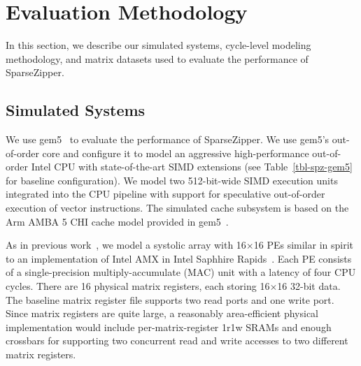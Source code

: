 
\section{Evaluation Methodology}
\label{sec-spz-methodology}

In this section, we describe our simulated systems, cycle-level modeling
methodology, and matrix datasets used to evaluate the performance of
SparseZipper.

\subsection{Simulated Systems}



We use gem5~\cite{binkert-gem5-sigarch2011, lowe-gem5-2020,
  ta-simulating-riscv-gem5-2018} to evaluate the performance of
SparseZipper. We use gem5's out-of-order core and configure it to model
an aggressive high-performance out-of-order Intel CPU with
state-of-the-art SIMD extensions (see Table~\ref{tbl-spz-gem5} for
baseline configuration). We model two 512-bit-wide SIMD execution units
integrated into the CPU pipeline with support for speculative
out-of-order execution of vector instructions. The simulated cache
subsystem is based on the Arm AMBA 5 CHI cache model provided in
gem5~\cite{chi-gem5}.


 As in previous
work~\cite{jeong-rasa-dac2021}, we model a systolic array with
16$\times$16 PEs similar in spirit to an implementation of Intel AMX in
Intel Saphhire Rapids~\cite{nassif-intel-sapphire-isscc2022}. Each PE
consists of a single-precision multiply-accumulate (MAC) unit with a
latency of four CPU cycles. There are 16 physical matrix registers, each
storing 16$\times$16 32-bit data.
The baseline matrix register file supports two read ports and one write
port.
Since matrix registers are quite large, a reasonably area-efficient physical
implementation would include per-matrix-register 1r1w SRAMs and enough
crossbars for supporting two concurrent read and write accesses to two
different matrix registers.

